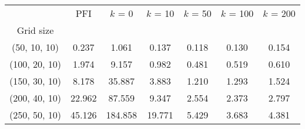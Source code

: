 \begin{tabular}{ccccccc}
\toprule
{} &     PFI &  $k$ = 0 &  $k$ = 10 &  $k$ = 50 &  $k$ = 100 &  $k$ = 200 \\
Grid size     &         &          &           &           &            &            \\
\midrule
(50, 10, 10)  &   0.237 &    1.061 &     0.137 &     0.118 &      0.130 &      0.154 \\
(100, 20, 10) &   1.974 &    9.157 &     0.982 &     0.481 &      0.519 &      0.610 \\
(150, 30, 10) &   8.178 &   35.887 &     3.883 &     1.210 &      1.293 &      1.524 \\
(200, 40, 10) &  22.962 &   87.559 &     9.347 &     2.554 &      2.373 &      2.797 \\
(250, 50, 10) &  45.126 &  184.858 &    19.771 &     5.429 &      3.683 &      4.381 \\
\bottomrule
\end{tabular}
